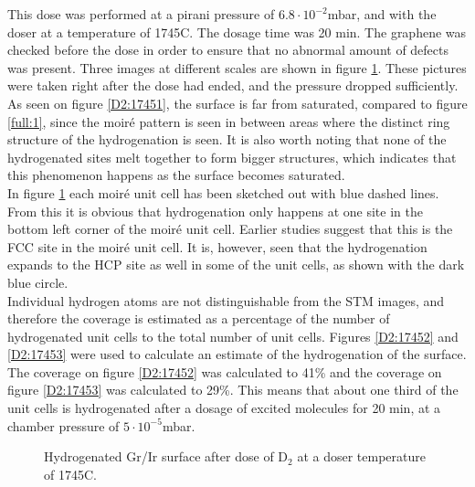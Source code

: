 This dose was performed at a pirani pressure of $6.8 \cdot 10^{-2}$mbar, and with the doser at a temperature of 1745\degree C. The dosage time was 20 min. The graphene was checked before the dose in order to ensure that no abnormal amount of defects was present. Three images at different scales are shown in figure \ref{D2:1745}. These pictures were taken right after the dose had ended, and the pressure dropped sufficiently. As seen on figure \ref{D2:17451}, the surface is far from saturated, compared to figure \ref{full:1}, since the moiré pattern is seen in between areas where the distinct ring structure of the hydrogenation is seen. It is also worth noting that none of the hydrogenated sites melt together to form bigger structures, which indicates that this phenomenon happens as the surface becomes saturated.\\
In figure \ref{D2:1745} each moiré unit cell has been sketched out with blue dashed lines. From this it is obvious that hydrogenation only happens at one site in the bottom left corner of the moiré unit cell. Earlier studies suggest that this is the FCC site in the moiré unit cell.\cite{Jakobunpublished} It is, however, seen that the hydrogenation expands to the HCP site as well in some of the unit cells, as shown with the dark blue circle.\\
Individual hydrogen atoms are not distinguishable from the STM images, and therefore the coverage is estimated as a percentage of the number of hydrogenated unit cells to the total number of unit cells. Figures \ref{D2:17452} and \ref{D2:17453} were used to calculate an estimate of the hydrogenation of the surface. The coverage on figure \ref{D2:17452} was calculated to 41\% and the coverage on figure \ref{D2:17453} was calculated to 29\%. This means that about one third of the unit cells is hydrogenated after a dosage of excited molecules for 20 min, at a chamber pressure of $5 \cdot 10^{-5}$mbar.

\begin{figure}[H]
\caption{Hydrogenated Gr/Ir surface after dose of D$_2$ at a doser temperature of 1745\degree C.}
\label{D2:1745}
\end{figure}

